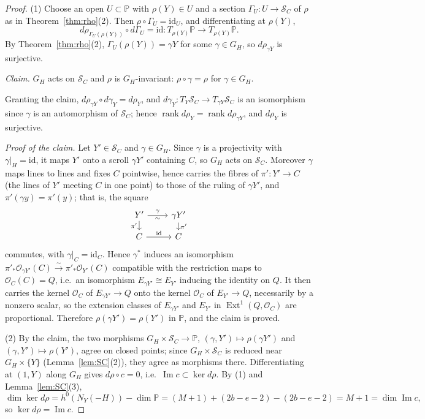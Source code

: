 \documentclass[11pt,reqno]{amsart}
\theoremstyle{plain}
\theoremstyle{definition}
\newcommand{\PP}{\mathbb{P}}
\newcommand{\OO}{\mathcal{O}}
\newcommand{\Ext}{\operatorname{Ext}}
\renewcommand{\Im}{\operatorname{Im}}
\newcommand{\id}{\mathrm{id}}
\newcommand{\NY}{N_{Y}}
\newcommand{\SC}{\mathcal{S}_C}
\newcommand{\GH}{G_H}
\begin{document}
\begin{proof}
(1) Choose an open $U\subset\PP$ with $\rho(Y)\in U$ and a section $\Gamma_U\colon U\to\SC$ of $\rho$ as in Theorem~\ref{thm:rho}(2). Then $\rho\circ\Gamma_U=\id_U$, and differentiating at $\rho(Y)$,
\[
d\rho_{\Gamma_U(\rho(Y))}\circ d\Gamma_U=\id\colon T_{\rho(Y)}\PP\to T_{\rho(Y)}\PP .
\]
By Theorem~\ref{thm:rho}(2), $\Gamma_U(\rho(Y))=\gamma Y$ for some $\gamma\in\GH$, so $d\rho_{\gamma Y}$ is surjective.

\emph{Claim.} $\GH$ acts on $\SC$ and $\rho$ is $\GH$-invariant: $\rho\circ\gamma=\rho$ for $\gamma\in\GH$.

Granting the claim, $d\rho_{\gamma Y}\circ d\gamma_Y=d\rho_Y$, and $d\gamma_Y\colon T_Y\SC\to T_{\gamma Y}\SC$ is an isomorphism since $\gamma$ is an automorphism of $\SC$; hence $\operatorname{rank}d\rho_Y=\operatorname{rank}d\rho_{\gamma Y}$, and $d\rho_Y$ is surjective.

\emph{Proof of the claim.} Let $Y'\in\SC$ and $\gamma\in\GH$. Since $\gamma$ is a projectivity with $\gamma|_H=\id$, it maps $Y'$ onto a scroll $\gamma Y'$ containing $C$, so $\GH$ acts on $\SC$. Moreover $\gamma$ maps lines to lines and fixes $C$ pointwise, hence carries the fibres of $\pi'\colon Y'\to C$ (the lines of $Y'$ meeting $C$ in one point) to those of the ruling of $\gamma Y'$, and $\pi'(\gamma y)=\pi'(y)$; that is, the square
\[
\begin{tikzcd}[row sep=small]
Y'\arrow[r,"\gamma","\sim"']\arrow[d,"\pi'"'] & \gamma Y'\arrow[d,"\pi'"]\\
C\arrow[r,"\id"] & C
\end{tikzcd}
\]
commutes, with $\gamma|_C=\id_C$. Hence $\gamma^*$ induces an isomorphism $\pi'_*\OO_{\gamma Y'}(C)\xrightarrow{\sim}\pi'_*\OO_{Y'}(C)$ compatible with the restriction maps to $\OO_C(C)=Q$, i.e.\ an isomorphism $E_{\gamma Y'}\cong E_{Y'}$ inducing the identity on $Q$. It then carries the kernel $\OO_C$ of $E_{\gamma Y'}\to Q$ onto the kernel $\OO_C$ of $E_{Y'}\to Q$, necessarily by a nonzero scalar, so the extension classes of $E_{\gamma Y'}$ and $E_{Y'}$ in $\Ext^1(Q,\OO_C)$ are proportional. Therefore $\rho(\gamma Y')=\rho(Y')$ in $\PP$, and the claim is proved.

(2) By the claim, the two morphisms $\GH\times\SC\to\PP$, $(\gamma,Y')\mapsto\rho(\gamma Y')$ and $(\gamma,Y')\mapsto\rho(Y')$, agree on closed points; since $\GH\times\SC$ is reduced near $\GH\times\{Y\}$ (Lemma~\ref{lem:SC}(2)), they agree as morphisms there. Differentiating at $(1,Y)$ along $\GH$ gives $d\rho\circ c=0$, i.e.\ $\Im c\subset\ker d\rho$. By (1) and Lemma~\ref{lem:SC}(3),
\[
\dim\ker d\rho=h^0(\NY(-H))-\dim\PP=(M+1)+(2b-e-2)-(2b-e-2)=M+1=\dim\Im c ,
\]
so $\ker d\rho=\Im c$.
\end{proof}
\end{document}
